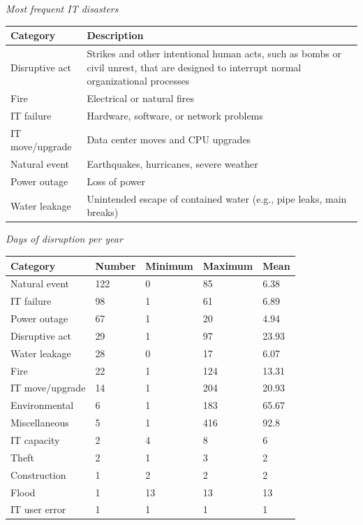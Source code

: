 \documentclass[
]{article}
\begin{document}
\emph{Most frequent IT disasters}

\begin{longtable}[]{@{}
  >{\raggedright\arraybackslash}p{}
  >{\raggedright\arraybackslash}p{}@{}}
\toprule
Category & Description \\
\midrule
\endhead
Disruptive act & Strikes and other intentional human acts, such as bombs or civil unrest, that are designed to interrupt normal organizational processes \\
Fire & Electrical or natural fires \\
IT failure & Hardware, software, or network problems \\
IT move/upgrade & Data center moves and CPU upgrades \\
Natural event & Earthquakes, hurricanes, severe weather \\
Power outage & Loss of power \\
Water leakage & Unintended escape of contained water (e.g., pipe leaks, main breaks) \\
\bottomrule
\end{longtable}

\emph{Days of disruption per year}

\begin{longtable}[]{@{}lllll@{}}
\toprule
Category & Number & Minimum & Maximum & Mean \\
\midrule
\endhead
Natural event & 122 & 0 & 85 & 6.38 \\
IT failure & 98 & 1 & 61 & 6.89 \\
Power outage & 67 & 1 & 20 & 4.94 \\
Disruptive act & 29 & 1 & 97 & 23.93 \\
Water leakage & 28 & 0 & 17 & 6.07 \\
Fire & 22 & 1 & 124 & 13.31 \\
IT move/upgrade & 14 & 1 & 204 & 20.93 \\
Environmental & 6 & 1 & 183 & 65.67 \\
Miscellaneous & 5 & 1 & 416 & 92.8 \\
IT capacity & 2 & 4 & 8 & 6 \\
Theft & 2 & 1 & 3 & 2 \\
Construction & 1 & 2 & 2 & 2 \\
Flood & 1 & 13 & 13 & 13 \\
IT user error & 1 & 1 & 1 & 1 \\
\bottomrule
\end{longtable}
\end{document}
